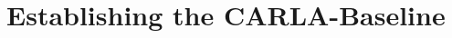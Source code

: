 \begin{comment}
\begin{equation} \label{eq:distortion_loss}
\mathcal{L}_{\text{distortion}} = \frac{1}{N} \sum_{i=1}^{N} \left(\sum_{j=1}^{M_i} w_{ij} \sum_{k=1}^{M_i} w_{ik} \left| \frac{t_{ij} + t_{ik}}{2} - \frac{t_{i,j-1} + t_{i,k-1}}{2} \right| \right) + \frac{1}{3N} \sum_{i=1}^{N} \sum_{j=1}^{M_i} w_{ij}^2 (t_{ij} - t_{i,j-1})
\end{equation}

\begin{center}
    \small{where $N$ is the number of ray samples, $M_i$ is the number of samples for the $i$-th ray, $w_{ij}$ is the weight for the $j$-th sample of the $i$-th ray, $t_{ij}$ is the $j$-th sample of the $i$-th ray in the $s$-domain, and $t_{i,j-1}$ is the $(j-1)$-th sample of the $i$-th ray in the $s$-domain.}
\end{center}


\begin{equation} \label{eq:interlevel_loss}
\mathcal{L}_{\text{interlevel}} = \frac{1}{N} \sum_{i=1}^{N-1} \frac{1}{M_i} \sum_{j=1}^{M_i} \left(\max(0, w_j - w_{\text{outer},ij})\right)^2 \cdot \frac{1}{w_j + \epsilon}
\end{equation}

\begin{center}
    \small{where $N$ is the number of ray samples, $M_i$ is the number of samples for the $i$-th ray, $w_j$ is the weight for the $j$-th sample of the $i$-th ray, $w_{\text{outer},ij}$ is the upper bound of the inner histogram for the $j$-th sample of the $i$-th ray, and $\epsilon$ is a small constant.}
\end{center}
\end{comment}




\section{Establishing the CARLA-Baseline}
\begin{comment}
Premise: Have a pipeline to test multiple CARLA-setups
Question: How do I find a CARLA-baseline?

\begin{itemize}
    \item Why do I need a baseline?
    \item How do I find suitable experiments?
    \item How do I evaluate the experiments against each other?
\end{itemize}
\end{comment}

